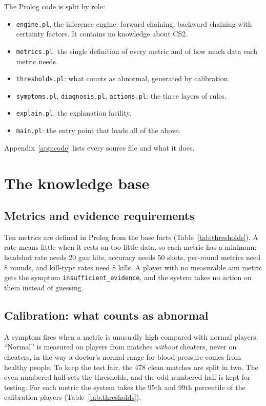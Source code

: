 \documentclass[11pt,a4paper]{article}
\newcommand{\code}[1]{\texttt{#1}}
\begin{document}
The Prolog code is split by role:
\begin{itemize}
  \item \code{engine.pl}, the inference engine: forward chaining, backward chaining with
        certainty factors. It contains no knowledge about CS2.
  \item \code{metrics.pl}: the single definition of every metric and of how much data each metric
        needs.
  \item \code{thresholds.pl}: what counts as abnormal, generated by calibration.
  \item \code{symptoms.pl}, \code{diagnosis.pl}, \code{actions.pl}: the three layers of rules.
  \item \code{explain.pl}: the explanation facility.
  \item \code{main.pl}: the entry point that loads all of the above.
\end{itemize}
Appendix~\ref{app:code} lists every source file and what it does.

\section{The knowledge base}

\subsection{Metrics and evidence requirements}
Ten metrics are defined in Prolog from the base facts (Table~\ref{tab:thresholds}). A rate means
little when it rests on too little data, so each metric has a minimum: headshot rate needs 20 gun
hits, accuracy needs 50 shots, per-round metrics need 8 rounds, and kill-type rates need 8 kills.
A player with no measurable aim metric gets the symptom \code{insufficient\_evidence}, and the system
takes no action on them instead of guessing.

\subsection{Calibration: what counts as abnormal}
\label{sec:calibration}
A symptom fires when a metric is unusually high compared with normal players. ``Normal'' is measured
on players from matches \emph{without} cheaters, never on cheaters, in the way a doctor's normal
range for blood pressure comes from healthy people. To keep the test fair, the 478 clean matches
are split in two. The even-numbered half sets the thresholds, and the odd-numbered half is kept for
testing. For each metric the system takes the 95th and 99th percentile of the calibration players
(Table~\ref{tab:thresholds}).
\end{document}
